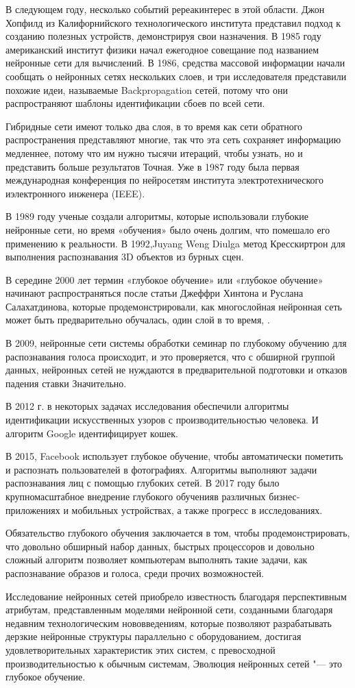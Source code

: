  В следующем году, несколько событий ререакинтерес в этой области.
 Джон Хопфилд из Калифорнийского технологического института представил подход к созданию полезных устройств, 
 демонстрируя свои назначения. В 1985 году американский институт физики начал ежегодное совещание под названием нейронные сети для вычислений.
 В 1986, средства массовой информации начали сообщать о нейронных сетях нескольких слоев, и три исследователя представили похожие идеи, 
 называемые Backpropagation сетей, потому что они распространяют шаблоны идентификации сбоев по всей сети.

 Гибридные сети имеют только два слоя, в то время как сети обратного распространения представляют многие,
 так что эта сеть сохраняет информацию медленнее, потому что им нужно тысячи итераций, чтобы узнать,
 но и представить больше результатов Точная. Уже в 1987 году была первая международная конференция 
 по нейросетям института электротехнического иэлектронного инженера (IEEE).

 В 1989 году ученые создали алгоритмы, которые использовали глубокие нейронные сети,
 но время «обучения» было очень долгим, 
 что помешало его применению к реальности. 
 В 1992,Juyang Weng Diulga метод Кресскиртрон 
 для выполнения распознавания 3D объектов из бурных сцен. 

 В середине 2000 лет термин «глубокое обучение» или «глубокое обучение» 
 начинают распространяться после статьи Джеффри Хинтона и Руслана Салахатдинова,
 которые продемонстрировали, как многослойная нейронная сеть 
 может быть предварительно обучалась, один слой в то время, . 

 В 2009, нейронные сети системы обработки семинар по глубокому обучению для распознавания голоса происходит, и это проверяется,
 что с обширной группой данных, нейронных сетей не нуждаются в предварительной подготовки и отказов падения ставки Значительно.

 В 2012 г. в некоторых задачах исследования обеспечили алгоритмы идентификации
 искусственных узоров с производительностью человека.
 И алгоритм Google идентифицирует кошек.

 В 2015, Facebook использует глубокое обучение, 
 чтобы автоматически пометить и распознать пользователей в фотографиях. 
 Алгоритмы выполняют задачи распознавания лиц с помощью глубоких сетей.
 В 2017 году было крупномасштабное внедрение глубокого обученияв различных
 бизнес-приложениях и мобильных устройствах, а также прогресс в исследованиях.

 Обязательство глубокого обучения заключается в том, 
 чтобы продемонстрировать, что довольно обширный набор данных,
 быстрых процессоров и довольно сложный алгоритм позволяет компьютерам выполнять такие задачи,
 как распознавание образов и голоса, среди прочих возможностей. 

 Исследование нейронных сетей приобрело известность благодаря перспективным атрибутам, 
 представленным моделями нейронной сети, созданными благодаря недавним технологическим нововведениям,
 которые позволяют разрабатывать дерзкие нейронные структуры параллельно с оборудованием,
 достигая удовлетворительных характеристик этих систем,
 с превосходной производительностью к обычным системам, 
 Эволюция нейронных сетей "--- это глубокое обучение.